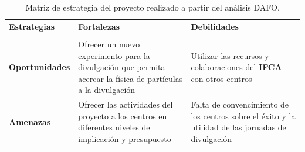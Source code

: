 \documentclass[11pt]{extarticle}
\begin{document}
					\begin{table}[H]
					    \centering
						\begin{tabular}{||m{3.5cm} | m{5.0cm} | m{5.0cm}||}
							\hline \hline
							\multirow{1}{3.5cm}{\centering \Large \textbf{Estrategias}}  & \multirow{1}{5.0cm}{\centering \Large  \textbf{Fortalezas}} & \multirow{1}{5.0cm}{\centering \Large  \textbf{Debilidades}} \\ 
							& & \\\hline
							\multirow{1}{3.5cm}{\centering \Large \textbf{Oportunidades}} & Ofrecer un nuevo experimento para la divulgación que permita acercar la física de partículas a la divulgación  & Utilizar las recursos y colaboraciones del \textbf{IFCA} con otros centros \\ \hline
							\multirow{1}{3.5cm}{\centering \Large \textbf{Amenazas}} & Ofrecer las actividades del proyecto a los centros en diferentes niveles de implicación y presupuesto & Falta de convencimiento de los centros sobre el éxito y la utilidad de las jornadas de divulgación \\
							\hline \hline
					    \end{tabular}
					    \caption{\label{tab:Estrategias} Matriz de estrategia del proyecto realizado a partir del análisis DAFO.}
					\end{table}

	\newpage

	
	
\end{document}
